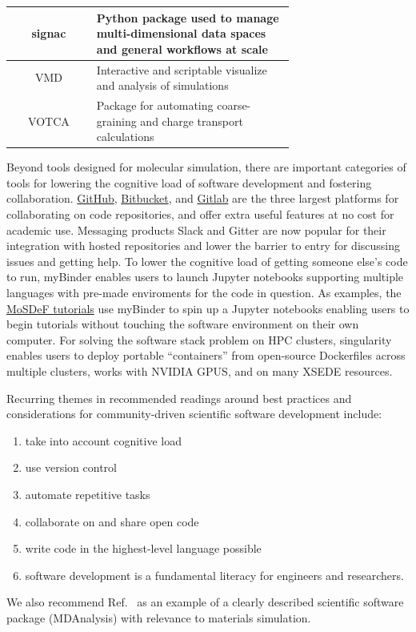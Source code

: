 \begin{table}
\begin{tabular}{|c|p{0.7\linewidth}|}
\hline signac\cite{Adorf2018,signac_zenodo} & Python package used to manage multi-dimensional data spaces and general workflows at scale  \\
\hline VMD\cite{Humphrey1996} & Interactive and scriptable visualize and analysis of simulations \\
\hline VOTCA\cite{Ruhle2009} & Package for automating coarse-graining and charge transport calculations \\
\hline
\end{tabular}
\label{table:open-source-tools}
\end{table}

Beyond tools designed for molecular simulation, there are important categories of tools for lowering the cognitive load of software development and fostering collaboration.
\href{https://help.github.com/en/articles/applying-for-an-educator-or-researcher-discount}{GitHub}, 
\href{https://bitbucket.org/product/education}{Bitbucket}, 
and 
\href{https://about.gitlab.com/solutions/education/}{Gitlab} 
are the three largest platforms \cite{gitpopular} for collaborating on code repositories, and offer extra useful features at no cost for academic use. 
Messaging products Slack and Gitter are now popular for their integration with hosted repositories \cite{chatpopular} and lower the barrier to entry for discussing issues and getting help.
To lower the cognitive load of getting someone else's code to run, myBinder \cite{project_jupyter-proc-scipy-2018} enables users to launch Jupyter notebooks supporting multiple languages with pre-made enviroments for the code in question.
As examples, the \href{https://github.com/mosdef-hub/mosdef_tutorials}{MoSDeF tutorials}\cite{mosdeftut} use myBinder to spin up a Jupyter notebooks enabling users to begin tutorials without touching the software environment on their own computer. 
For solving the software stack problem on HPC clusters, singularity \cite{singularity2017} enables users to deploy portable ``containers'' from open-source Dockerfiles\cite{Merkel:2014:DLL:2600239.2600241} across multiple clusters, works with NVIDIA GPUS, and on many XSEDE resources.

Recurring themes in recommended readings \cite{Crick2015,Wilson2014,Katz2017} around best practices and considerations for community-driven scientific software development include:
\begin{enumerate}
    \item take into account cognitive load
    \item use version control
    \item automate repetitive tasks
    \item collaborate on and share open code
    \item write code in the highest-level language possible
    \item software development is a fundamental literacy for engineers and researchers.
\end{enumerate}
We also recommend Ref.~\cite{Gowers2016} as an example of a clearly described scientific software package (MDAnalysis) with relevance to materials simulation.

